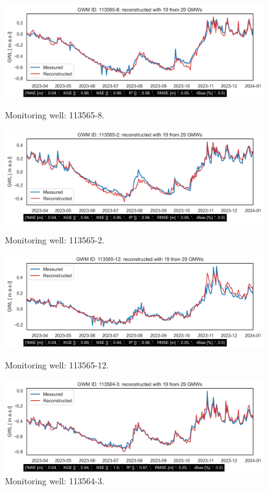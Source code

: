 \begin{figure}[htbp]
    \begin{minipage}{0.48\textwidth}
        \centering
        \includegraphics[width=\linewidth]{GWM_reconstructed113565-8.png}
        \caption{Monitoring well: 113565-8.}
        \label{fig:gwm-113565-8}
    \end{minipage}\hfill
    \begin{minipage}{0.48\textwidth}
        \centering
        \includegraphics[width=\linewidth]{GWM_reconstructed113565-2.png}
        \caption{Monitoring well: 113565-2.}
        \label{fig:gwm-113565-2}
    \end{minipage}
    
    \begin{minipage}{0.48\textwidth}
        \centering
        \includegraphics[width=\linewidth]{GWM_reconstructed113565-12.png}
        \caption{Monitoring well: 113565-12.}
        \label{fig:gwm-113565-12}
    \end{minipage}\hfill
    \begin{minipage}{0.48\textwidth}
        \centering
        \includegraphics[width=\linewidth]{GWM_reconstructed113564-3.png}
        \caption{Monitoring well: 113564-3.}
        \label{fig:gwm-113564-3}
    \end{minipage}


\end{figure}
